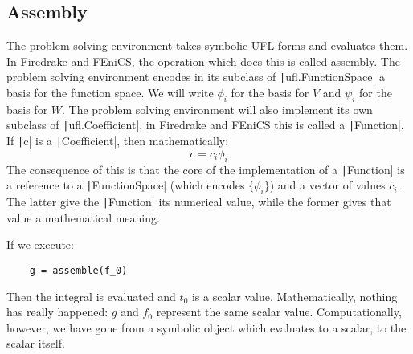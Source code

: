 \documentclass[a4paper,11pt]{article}
\begin{document}
\subsection{Assembly}

The problem solving environment takes symbolic UFL forms and evaluates them. In Firedrake and FEniCS, the operation which does this is called assembly. The problem solving environment encodes in its subclass of \texttt|ufl.FunctionSpace| a basis for the function space. We will write ${\phi_i}$ for the basis for $V$ and ${\psi_i}$ for the basis for $W$. The problem solving environment will also implement its own subclass of \texttt|ufl.Coefficient|, in Firedrake and FEniCS this is called a \texttt|Function|. If \texttt|c| is a \texttt|Coefficient|, then mathematically:
\begin{equation}
    c = c_i\phi_i
\end{equation}
The consequence of this is that the core of the implementation of a \texttt|Function| is a reference to a \texttt|FunctionSpace| (which encodes $\{\phi_i\}$) and a vector of values $c_i$. The latter give the \texttt|Function| its numerical value, while the former gives that value a mathematical meaning.

If we execute:
\begin{verbatim}
    g = assemble(f_0)
\end{verbatim}
Then the integral is evaluated and $t_0$ is a scalar value. Mathematically, nothing has really happened: $g$ and $f_0$ represent the same scalar value. Computationally, however, we have gone from a symbolic object which evaluates to a scalar, to the scalar itself.
\end{document}
